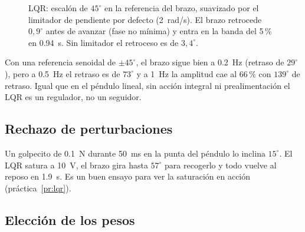 \begin{figure}[H]
\centering
{}
\caption{LQR: escalón de $45^\circ$ en la referencia del brazo, suavizado por el limitador de pendiente por defecto (\SI{2}{rad/s}). El brazo retrocede $0{,}9^\circ$ antes de avanzar (fase no mínima) y entra en la banda del 5\,\% en \SI{0.94}{s}. Sin limitador el retroceso es de $3{,}4^\circ$.}
\label{fig:lqrstep}
\end{figure}

Con una referencia senoidal de $\pm45^\circ$, el brazo sigue bien a \SI{0.2}{Hz} (retraso de $29^\circ$), pero a \SI{0.5}{Hz} el retraso es de $73^\circ$ y a \SI{1}{Hz} la amplitud cae al 66\,\% con $139^\circ$ de retraso. Igual que en el péndulo lineal, sin acción integral ni prealimentación el LQR es un regulador, no un seguidor.

\subsection{Rechazo de perturbaciones}

Un golpecito de \SI{0.1}{N} durante \SI{50}{ms} en la punta del péndulo lo inclina $15^\circ$. El LQR satura a \SI{10}{V}, el brazo gira hasta $57^\circ$ para recogerlo y todo vuelve al reposo en \SI{1.9}{s}. Es un buen ensayo para ver la saturación en acción (práctica~\ref{pr:lqr}).

\subsection{Elección de los pesos}

